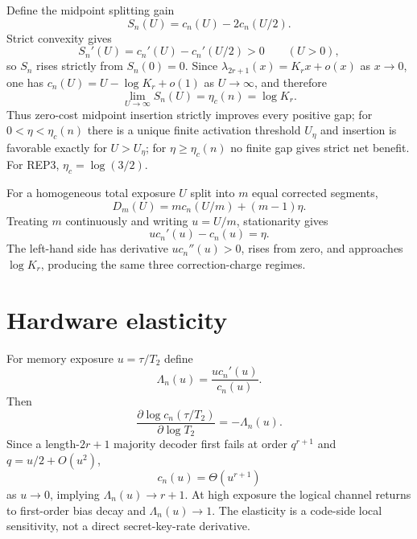 \documentclass[aps,prx,preprint,superscriptaddress,nofootinbib,longbibliography]{revtex4-2}
\begin{document}
Define the midpoint splitting gain
\begin{equation}
S_n(U)=c_n(U)-2c_n(U/2).
\end{equation}
Strict convexity gives
\begin{equation}
S_n'(U)=c_n'(U)-c_n'(U/2)>0\qquad(U>0),
\end{equation}
so $S_n$ rises strictly from $S_n(0)=0$. Since $\lambda_{2r+1}(x)=K_rx+o(x)$ as $x\to0$, one has $c_n(U)=U-\log K_r+o(1)$ as $U\to\infty$, and therefore
\begin{equation}
\lim_{U\to\infty}S_n(U)=\eta_c(n)=\log K_r.
\end{equation}
Thus zero-cost midpoint insertion strictly improves every positive gap; for $0<\eta<\eta_c(n)$ there is a unique finite activation threshold $U_\eta$ and insertion is favorable exactly for $U>U_\eta$; for $\eta\ge\eta_c(n)$ no finite gap gives strict net benefit. For REP3, $\eta_c=\log(3/2)$.

For a homogeneous total exposure $U$ split into $m$ equal corrected segments,
\begin{equation}
D_m(U)=m c_n(U/m)+(m-1)\eta.
\end{equation}
Treating $m$ continuously and writing $u=U/m$, stationarity gives
\begin{equation}
u c_n'(u)-c_n(u)=\eta.
\end{equation}
The left-hand side has derivative $u c_n''(u)>0$, rises from zero, and approaches $\log K_r$, producing the same three correction-charge regimes.

\section{Hardware elasticity}
For memory exposure $u=\tau/T_2$ define
\begin{equation}
\Lambda_n(u)=\frac{u c_n'(u)}{c_n(u)}.
\end{equation}
Then
\begin{equation}
\frac{\partial\log c_n(\tau/T_2)}{\partial\log T_2}=-\Lambda_n(u).
\end{equation}
Since a length-$2r+1$ majority decoder first fails at order $q^{r+1}$ and $q=u/2+O(u^2)$,
\begin{equation}
c_n(u)=\Theta(u^{r+1})
\end{equation}
as $u\to0$, implying $\Lambda_n(u)\to r+1$. At high exposure the logical channel returns to first-order bias decay and $\Lambda_n(u)\to1$. The elasticity is a code-side local sensitivity, not a direct secret-key-rate derivative.
\end{document}
